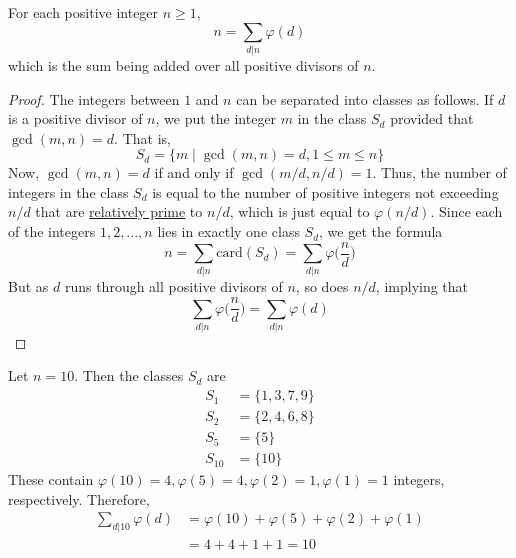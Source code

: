 \documentclass{article}
\newcounter{theorem}[section]
\newcounter{example}[section]
\begin{document}
\begin{theorem}[Gauss]
  \label{thm:gauss}
For each positive integer $n \geq 1$, 
\begin{equation}
  n = \sum_{d|n} \varphi(d)
\end{equation}
which is the sum being added over all positive divisors of $n$. 
\end{theorem}
\begin{proof}
The integers between $1$ and $n$ can be separated into classes as follows. If $d$ is a positive divisor of $n$, we put the integer $m$ in the class $S_d$ provided that $\gcd(m, n) = d$. That is, 
\begin{equation}
  S_d = \{m\;|\; \gcd(m, n) = d, 1 \leq m \leq n\}
\end{equation}
Now, $\gcd(m, n) = d$ if and only if $\gcd(m/d, n/d) = 1$. Thus, the number of integers in the class $S_d$ is equal to the number of positive integers not exceeding $n/d$ that are \hyperref[def:relatively-prime]{relatively prime} to $n/d$, which is just equal to $\varphi(n/d)$. Since each of the integers $1, 2, ..., n$ lies in exactly one class $S_d$, we get the formula
\begin{equation}
  n = \sum_{d|n} \text{card}(S_d) = \sum_{d|n} \varphi \bigg(\frac{n}{d} \bigg)
\end{equation}
But as $d$ runs through all positive divisors of $n$, so does $n/d$, implying that
\begin{equation}
  \sum_{d|n} \varphi \bigg( \frac{n}{d} \bigg) = \sum_{d|n} \varphi (d)
\end{equation}
\end{proof}

\begin{example}[Partitioning Residues by GCD for $n = 10$]
  \label{ex:partitioning-residues-by-gcd-for-n10}
Let $n=10$. Then the classes $S_d$ are 
\begin{align*}
    S_1 & = \{1, 3, 7, 9\} \\
    S_2 & = \{2, 4, 6, 8\} \\
    S_5 & = \{5\} \\
    S_{10} & = \{10\}
\end{align*}
These contain $\varphi(10) = 4, \varphi(5) = 4, \varphi(2) = 1, \varphi(1) = 1$ integers, respectively. Therefore, 
\begin{align*}
    \sum_{d|10} \varphi(d) & = \varphi(10) + \varphi(5) + \varphi(2) + \varphi(1) \\
    & = 4 + 4 + 1 + 1 = 10 
\end{align*}
\end{example}
\end{document}
